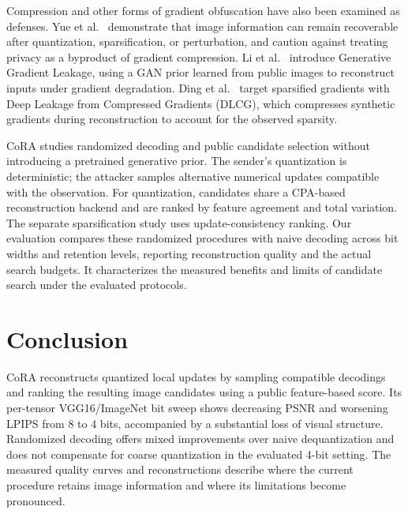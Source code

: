 \documentclass{article}
\newcommand{\cora}{CoRA}
\begin{document}
Compression and other forms of gradient obfuscation have also been
examined as defenses. Yue et al.~\cite{yue2023gradient} demonstrate that
image information can remain recoverable after quantization,
sparsification, or perturbation, and caution against treating privacy
as a byproduct of gradient compression. Li et al.~\cite{li2022ggl}
introduce Generative Gradient Leakage, using a GAN prior learned from
public images to reconstruct inputs under gradient degradation.
Ding et al.~\cite{ding2024compressed} target sparsified gradients with
Deep Leakage from Compressed Gradients (DLCG), which compresses synthetic
gradients during reconstruction to account for the observed sparsity.

\cora{} studies randomized decoding and public candidate selection
without introducing a pretrained generative prior. The sender's
quantization is deterministic; the attacker samples alternative numerical
updates compatible with the observation. For quantization, candidates
share a CPA-based reconstruction backend and are ranked by feature
agreement and total variation. The separate sparsification study uses
update-consistency ranking. Our evaluation compares these randomized
procedures with naive decoding across bit widths and retention levels,
reporting reconstruction quality and the actual search budgets.
It characterizes the measured benefits and limits of candidate search
under the evaluated protocols.

\section{Conclusion}
\cora{} reconstructs quantized local updates by sampling compatible
decodings and ranking the resulting image candidates using a public
feature-based score. Its per-tensor VGG16/ImageNet bit sweep shows
decreasing PSNR and worsening LPIPS from 8 to 4 bits, accompanied by a
substantial loss of visual structure. Randomized decoding offers mixed
improvements over naive dequantization and does not compensate for
coarse quantization in the evaluated 4-bit setting. The measured quality
curves and reconstructions describe where the current procedure retains
image information and where its limitations become pronounced.
\end{document}
